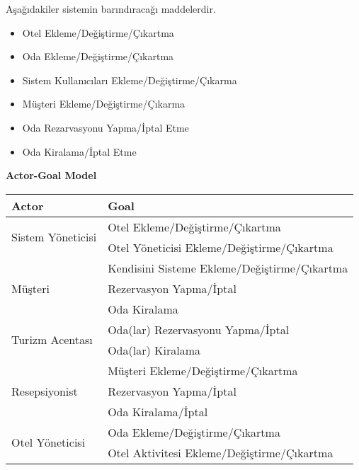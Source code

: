 \documentclass[12pt,a4paper]{report}
\begin{document}
Aşağıdakiler sistemin barındıracağı maddelerdir.

\begin{itemize}

\item Otel Ekleme/Değiştirme/Çıkartma
\item Oda Ekleme/Değiştirme/Çıkartma
\item Sistem Kullanıcıları Ekleme/Değiştirme/Çıkarma
\item Müşteri Ekleme/Değiştirme/Çıkarma
\item Oda Rezarvasyonu Yapma/İptal Etme
\item Oda Kiralama/İptal Etme

\end{itemize}

\newpage

{
\bf
\center
Actor-Goal Model \\[1cm]
}
\begin{tabular}{ |p{5cm} | p{9cm} |}

\hline
Actor & Goal \\ \hline

\multirow{2}{*}{Sistem Yöneticisi}
& 
Otel Ekleme/Değiştirme/Çıkartma \\
&
Otel Yöneticisi Ekleme/Değiştirme/Çıkartma \\

\hline

\multirow{3}{*}{Müşteri}
&
Kendisini Sisteme Ekleme/Değiştirme/Çıkartma \\
&
Rezervasyon Yapma/İptal \\
&
Oda Kiralama \\

\hline

\multirow{2}{*}{Turizm Acentası}
&
Oda(lar) Rezervasyonu Yapma/İptal \\
&
Oda(lar) Kiralama \\

\hline

\multirow{3}{*}{Resepsiyonist}
&
Müşteri Ekleme/Değiştirme/Çıkartma \\
&
Rezervasyon Yapma/İptal \\
&
Oda Kiralama/İptal \\

\hline

\multirow{2}{*}{Otel Yöneticisi}
&
Oda Ekleme/Değiştirme/Çıkartma \\
&
Otel Aktivitesi Ekleme/Değiştirme/Çıkartma \\

\hline

\end{tabular}
\end{document}
